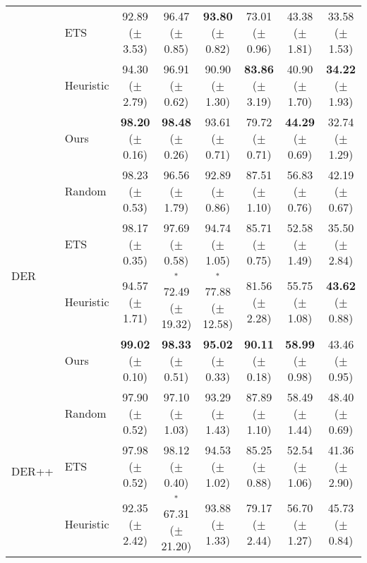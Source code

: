 \begin{table*}[t]
{\begin{tabular}{l l c c c c c c}
     & ETS  & 92.89 {\scriptsize ($\pm$ 3.53)} & 96.47 {\scriptsize ($\pm$ 0.85)} & {\bf 93.80} {\scriptsize ($\pm$ 0.82)} & 73.01 {\scriptsize ($\pm$ 0.96)} & 43.38 {\scriptsize ($\pm$ 1.81)} & 33.58 {\scriptsize ($\pm$ 1.53)} \\
    & Heuristic & 94.30 {\scriptsize ($\pm$ 2.79)} & 96.91 {\scriptsize ($\pm$ 0.62)} & 90.90 {\scriptsize ($\pm$ 1.30)} & {\bf 83.86} {\scriptsize ($\pm$ 3.19)} & 40.90 {\scriptsize ($\pm$ 1.70)}  & {\bf 34.22} {\scriptsize ($\pm$ 1.93)} \\
    & Ours &  {\bf 98.20} {\scriptsize ($\pm$ 0.16)} & {\bf 98.48} {\scriptsize ($\pm$ 0.26)} &  93.61 {\scriptsize ($\pm$ 0.71)} & 79.72 {\scriptsize ($\pm$ 0.71)} & {\bf 44.29} {\scriptsize ($\pm$ 0.69)} & 32.74 {\scriptsize ($\pm$ 1.29)} \\  
    \midrule 
    \multirow{4}{*}{DER} & Random & 98.23 {\scriptsize ($\pm$ 0.53)} & 96.56 {\scriptsize ($\pm$ 1.79)}  & 92.89 {\scriptsize ($\pm$ 0.86)} & 87.51 {\scriptsize ($\pm$ 1.10)} & 56.83 {\scriptsize ($\pm$ 0.76)} & 42.19  {\scriptsize ($\pm$ 0.67)} \\ 
     & ETS  & 98.17 {\scriptsize ($\pm$ 0.35)} & 97.69 {\scriptsize ($\pm$ 0.58)} & 94.74 {\scriptsize ($\pm$ 1.05)} & 85.71 {\scriptsize ($\pm$ 0.75)} & 52.58 {\scriptsize ($\pm$ 1.49)} & 35.50  {\scriptsize ($\pm$ 2.84)} \\
    & Heuristic & 94.57 {\scriptsize ($\pm$ 1.71)} & $^{*}$72.49 {\scriptsize ($\pm$ 19.32)} & $^{*}$77.88 {\scriptsize ($\pm$ 12.58)} & 81.56 {\scriptsize ($\pm$ 2.28)} & 55.75 {\scriptsize ($\pm$ 1.08)} & {\bf 43.62} {\scriptsize ($\pm$ 0.88)} \\
     & Ours & {\bf 99.02} {\scriptsize ($\pm$ 0.10)} & {\bf 98.33} {\scriptsize ($\pm$ 0.51)} & {\bf 95.02} {\scriptsize ($\pm$ 0.33)} & {\bf 90.11} {\scriptsize ($\pm$ 0.18)} & {\bf 58.99} {\scriptsize ($\pm$ 0.98)} & 43.46  {\scriptsize ($\pm$ 0.95)}  \\  
    \midrule 
    \multirow{4}{*}{DER++} & Random & 97.90 {\scriptsize ($\pm$ 0.52)} & 97.10 {\scriptsize ($\pm$ 1.03)}  & 93.29 {\scriptsize ($\pm$ 1.43)} & 87.89 {\scriptsize ($\pm$ 1.10)} & 58.49  {\scriptsize ($\pm$ 1.44)} & 48.40  {\scriptsize ($\pm$ 0.69)} \\ 
     & ETS & 97.98 {\scriptsize ($\pm$ 0.52)} & 98.12 {\scriptsize ($\pm$ 0.40)} & 94.53 {\scriptsize ($\pm$ 1.02)} & 85.25 {\scriptsize ($\pm$ 0.88)} & 52.54  {\scriptsize ($\pm$ 1.06)} & 41.36  {\scriptsize ($\pm$ 2.90)} \\
    & Heuristic & 92.35 {\scriptsize ($\pm$ 2.42)} & $^{*}$67.31 {\scriptsize ($\pm$ 21.20)} & 93.88 {\scriptsize ($\pm$ 1.33)} & 79.17 {\scriptsize ($\pm$ 2.44)} & 56.70 {\scriptsize ($\pm$ 1.27)} & 45.73 {\scriptsize ($\pm$ 0.84)} \\

\end{tabular}}
\end{table*}

